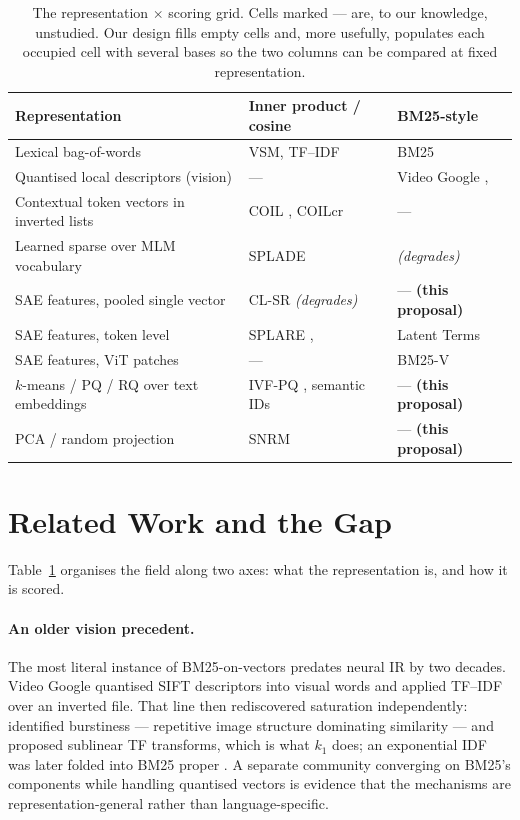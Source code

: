 \documentclass[11pt]{article}
\begin{document}
\begin{table}[t]
\centering\small
\begin{tabular}{lll}
\toprule
Representation & Inner product / cosine & BM25-style \\
\midrule
Lexical bag-of-words & VSM, TF--IDF & BM25 \citep{robertson1995okapi} \\
Quantised local descriptors (vision) & --- & Video Google \citep{sivic2003video}, \citep{zheng2018sift} \\
Contextual token vectors in inverted lists & COIL \citep{gao2021coil}, COILcr \citep{fan2023coilcr} & --- \\
Learned sparse over MLM vocabulary & SPLADE \citep{formal2021splade} & \citep{clavie2026latent} \textit{(degrades)} \\
SAE features, pooled single vector & CL-SR \citep{park2025clsr} \textit{(degrades)} & --- \textbf{(this proposal)} \\
SAE features, token level & SPLARE \citep{formal2026splare}, \citep{zong2026tokens} & Latent Terms \citep{clavie2026latent} \\
SAE features, ViT patches & --- & BM25-V \citep{han2026bm25v} \\
$k$-means / PQ / RQ over text embeddings & IVF-PQ \citep{jegou2011pq}, semantic IDs \citep{zhu2024hourglass} & --- \textbf{(this proposal)} \\
PCA / random projection & SNRM \citep{zamani2018snrm} & --- \textbf{(this proposal)} \\
\bottomrule
\end{tabular}
\caption{The representation $\times$ scoring grid. Cells marked --- are, to our knowledge, unstudied. Our design fills empty cells and, more usefully, populates each occupied cell with several bases so the two columns can be compared at fixed representation.}
\label{tab:grid}
\end{table}

\section{Related Work and the Gap}

Table~\ref{tab:grid} organises the field along two axes: what the representation is, and how it is scored.

\paragraph{An older vision precedent.} The most literal instance of BM25-on-vectors predates neural IR by two decades. Video Google \citep{sivic2003video} quantised SIFT descriptors into visual words and applied TF--IDF over an inverted file. That line then rediscovered saturation independently: \citet{jegou2009burstiness} identified burstiness --- repetitive image structure dominating similarity --- and proposed sublinear TF transforms, which is what $k_1$ does; an exponential IDF was later folded into BM25 proper \citep{zheng2018sift}. A separate community converging on BM25's components while handling quantised vectors is evidence that the mechanisms are representation-general rather than language-specific.
\end{document}
